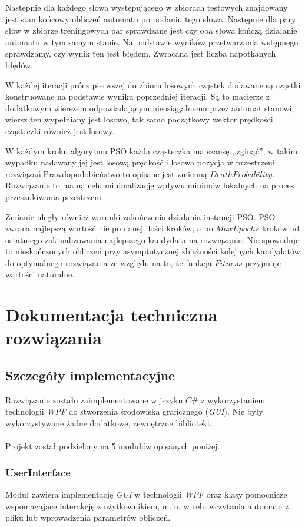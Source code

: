 \documentclass{../llncs_template_final/llncs}
\begin{document}
Następnie dla każdego słowa występującego w zbiorach testowych znajdowany jest stan końcowy obliczeń automatu po podaniu tego słowa. Następnie dla pary słów w zbiorze treningowych par sprawdzane jest czy oba słowa kończą działanie automatu w tym samym stanie. Na podstawie wyników przetwarzania wstępnego sprawdzamy, czy wynik ten jest błędem. Zwracana jest liczba napotkanych błędów. 

W każdej iteracji prócz pierwszej do zbioru losowych cząstek dodawane są cząstki konstruowane na podstawie wyniku poprzedniej iteracji. Są to macierze z dodatkowym wierszem odpowiadającym nieosiągalnemu przez automat stanowi, wiersz ten wypełniany jest losowo, tak samo początkowy wektor prędkości cząsteczki również jest losowy.

W każdym kroku algorytmu PSO każda cząsteczka ma szansę ,,zginąć'', w takim wypadku nadawany jej jest losową prędkość i losowa pozycja w przestrzeni rozwiązań.Prawdopodobieństwo to opisane jest zmienną $DeathProbability$. Rozwiązanie to ma na celu minimalizację wpływu minimów lokalnych na proces przeszukiwania przestrzeni.

Zmianie uległy również warunki zakończenia działania instancji PSO. PSO zwraca najlepszą wartość nie po danej ilości kroków, a po $MaxEpochs$ kroków od ostatniego zaktualizowania najlepszego kandydata na rozwiązanie. Nie spowoduje to nieskończonych obliczeń przy asymptotycznej zbieżności kolejnych kandydatów do optymalnego rozwiązania ze względu na to, że funkcja $Fitness$ przyjmuje wartości naturalne.

\newpage

\section{Dokumentacja techniczna rozwiązania}

\subsection{Szczegóły implementacyjne}

Rozwiązanie zostało zaimplementowane w języku $C\#$ z wykorzystaniem technologii \emph{WPF} do stworzenia środowiska graficznego (\emph{GUI}). Nie były wykorzystywane żadne dodatkowe, zewnętrzne biblioteki.
\\
\\
Projekt został podzielony na 5 modułów opisanych poniżej.

\subsubsection*{UserInterface}
Moduł zawiera implementację \emph{GUI} w technologii \emph{WPF} oraz klasy pomocnicze wspomagające interakcję z użytkownikiem, m.in. w celu wczytania automatu z pliku lub wprowadzenia parametrów obliczeń.
\end{document}
